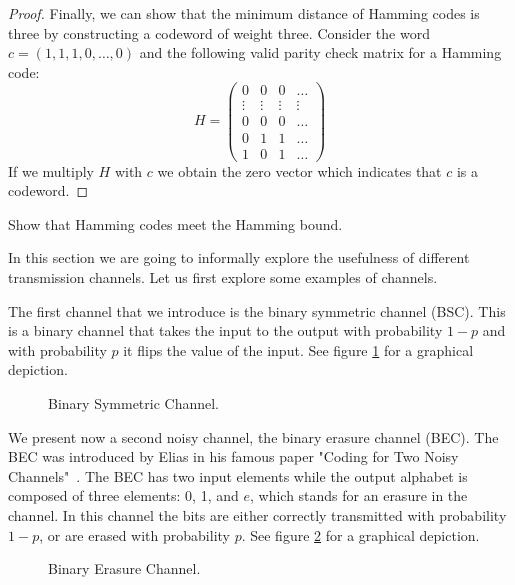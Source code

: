\begin{proof}
Finally, we can show that the minimum distance of Hamming codes is three by constructing a codeword of weight three. Consider the word $c=(1,1,1,0,\ldots,0)$ and the following valid parity check matrix for a Hamming code:
\begin{equation}
H=
\begin{pmatrix}
0      & 0      & 0      &\ldots\\
\vdots & \vdots & \vdots &\vdots\\ 
0      & 0      & 0      &\ldots\\
0      & 1      & 1      &\ldots\\
1      & 0      & 1      &\ldots
\end{pmatrix}
\end{equation}
If we multiply $H$ with $c$ we obtain the zero vector which indicates that $c$ is a codeword.
\end{proof}
\begin{exercise}
Show that Hamming codes meet the Hamming bound.
\end{exercise}
In this section we are going to informally explore the usefulness of different transmission channels. Let us first explore some examples of channels.

The first channel that we introduce is the binary symmetric channel (BSC). This is a binary channel that takes the input to the output with probability $1-p$ and with probability $p$ it flips the value of the input. See figure \ref{fig:bsc} for a graphical depiction.
\begin{figure}[h]
\begin{center}
\def\svgwidth{\columnwidth} 
 
\caption{Binary Symmetric Channel.}
\label{fig:bsc}
\end{center}
\end{figure}

We present now a second noisy channel, the binary erasure channel (BEC). The BEC was introduced by Elias in his famous paper "Coding for Two Noisy Channels"~\cite{elias1955coding}. The BEC has two input elements while the output alphabet is composed of three elements: 0, 1, and $e$, which stands for an erasure in the channel. In this channel the bits are either correctly transmitted with probability $1-p$, or are erased with probability $p$. See figure \ref{fig:bec} for a graphical depiction.

\begin{figure}[h]
\begin{center}
\def\svgwidth{\columnwidth} 
 
\caption{Binary Erasure Channel.}
\label{fig:bec}
\end{center}
\end{figure}

